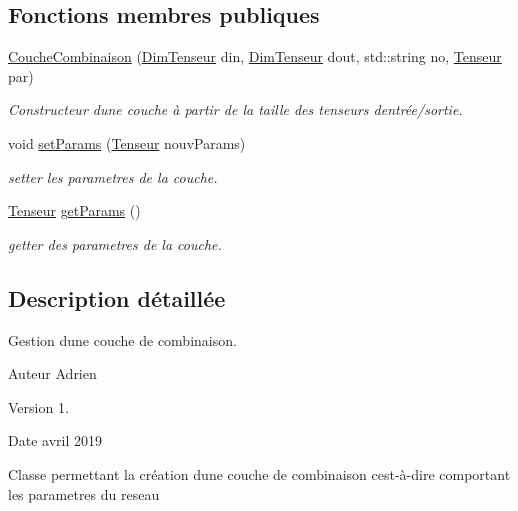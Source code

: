 \subsection*{Fonctions membres publiques}
\begin{DoxyCompactItemize}
\item 
\mbox{\label{class_couche_combinaison_aa28fcb2c8d4197e75b43873a0824d38f}} 
\hyperlink{class_couche_combinaison_aa28fcb2c8d4197e75b43873a0824d38f}{Couche\+Combinaison} (\hyperlink{class_dim_tenseur}{Dim\+Tenseur} din, \hyperlink{class_dim_tenseur}{Dim\+Tenseur} dout, std\+::string no, \hyperlink{class_tenseur}{Tenseur} par)
\begin{DoxyCompactList}\small\item\em Constructeur d\textquotesingle{}une couche à partir de la taille des tenseurs d\textquotesingle{}entrée/sortie. \end{DoxyCompactList}\item 
\mbox{\label{class_couche_combinaison_abdd34f81cb1298a4a9b2c8cef091db81}} 
void \hyperlink{class_couche_combinaison_abdd34f81cb1298a4a9b2c8cef091db81}{set\+Params} (\hyperlink{class_tenseur}{Tenseur} nouv\+Params)
\begin{DoxyCompactList}\small\item\em setter les parametres de la couche. \end{DoxyCompactList}\item 
\hyperlink{class_tenseur}{Tenseur} \hyperlink{class_couche_combinaison_a49d595f069641090c8fbbdff025db259}{get\+Params} ()
\begin{DoxyCompactList}\small\item\em getter des parametres de la couche. \end{DoxyCompactList}\end{DoxyCompactItemize}


\subsection{Description détaillée}
Gestion d\textquotesingle{}une couche de combinaison. 

\begin{DoxyAuthor}{Auteur}
Adrien 
\end{DoxyAuthor}
\begin{DoxyVersion}{Version}
1. 
\end{DoxyVersion}
\begin{DoxyDate}{Date}
avril 2019
\end{DoxyDate}
Classe permettant la création d\textquotesingle{}une couche de combinaison c\textquotesingle{}est-\/à-\/dire comportant les parametres du reseau 

